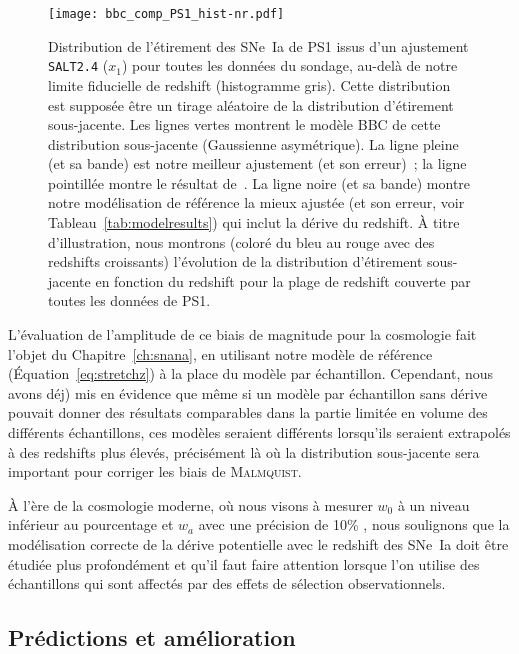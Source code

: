 \documentclass[../main/main.tex]{subfiles}
\begin{document}
\begin{figure}
    \centering
    \texttt{[image: bbc\_comp\_PS1\_hist-nr.pdf]}
    \caption[Comparaison des modélisations de BBC et de notre modèle de
    référence sur l'histogramme des étirements de PS1.]{Distribution de
        l'étirement des SNe~Ia de PS1 issus d'un ajustement \texttt{SALT2.4}
        ($x_1$) pour toutes les données du sondage, au-delà de notre limite
        fiducielle de redshift (histogramme gris). Cette distribution est
        supposée être un tirage aléatoire de la distribution d'étirement
        sous-jacente. Les lignes vertes montrent le modèle BBC de cette
        distribution sous-jacente (Gaussienne asymétrique). La ligne pleine (et
        sa bande) est notre meilleur ajustement (et son erreur)~; la ligne
        pointillée montre le résultat de~\cite{scolnic2018}. La ligne noire (et
        sa bande) montre notre modélisation de référence la mieux ajustée (et
        son erreur, voir Tableau~\ref{tab:modelresults}) qui inclut la dérive du
        redshift. À titre d'illustration, nous montrons (coloré du bleu au rouge
        avec des redshifts croissants) l'évolution de la distribution
        d'étirement sous-jacente en fonction du redshift pour la plage de
    redshift couverte par toutes les données de PS1.}
    \label{fig:bbc_pdf_ps1}
\end{figure}

L'évaluation de l'amplitude de ce biais de magnitude pour la cosmologie fait
l'objet du Chapitre~\ref{ch:snana}, en utilisant notre modèle de référence
(Équation~\ref{eq:stretchz}) à la place du modèle par échantillon. Cependant,
nous avons déj) mis en évidence que même si un modèle par échantillon sans
dérive pouvait donner des résultats comparables dans la partie limitée en volume
des différents échantillons, ces modèles seraient différents lorsqu'ils
seraient extrapolés à des redshifts plus élevés, précisément là où la
distribution sous-jacente sera important pour corriger les biais de
\textsc{Malmquist}.

À l'ère de la cosmologie moderne, où nous visons à mesurer $w_0$ à un niveau
inférieur au pourcentage et $w_a$ avec une précision de 10\% \citep[par
exemple,][]{ivezic2019}, nous soulignons que la modélisation correcte de la
dérive potentielle avec le redshift des SNe~Ia doit être étudiée plus
profondément et qu'il faut faire attention lorsque l'on utilise des échantillons
qui sont affectés par des effets de sélection observationnels.

\subsection{Prédictions et amélioration}\label{ssec:xpred}
\end{document}
